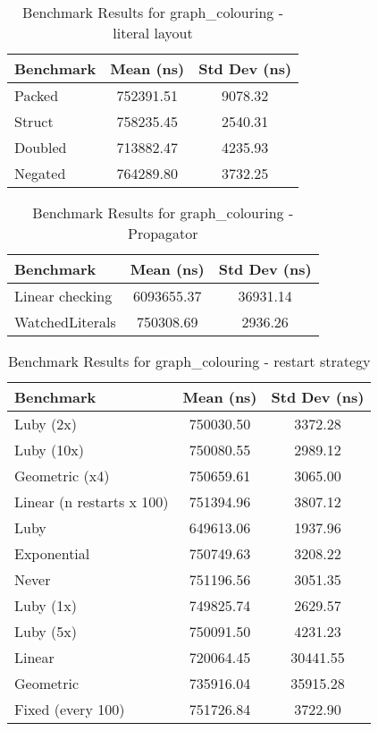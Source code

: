 \begin{table}[h]
    \centering
    \caption{Benchmark Results for graph\_colouring - literal layout}
    \begin{tabular}{|l|c|c|}
        \hline
        Benchmark & Mean (ns) & Std Dev (ns) \\
        \hline
        Packed & 752391.51 & 9078.32 \\
        Struct & 758235.45 & 2540.31 \\
        Doubled & 713882.47 & 4235.93 \\
        Negated & 764289.80 & 3732.25 \\
        \hline
    \end{tabular}
\label{tab:bench-graph_colouring---literal-layout}
\end{table}


\begin{table}[h]
    \centering
    \caption{Benchmark Results for graph\_colouring - Propagator}
    \begin{tabular}{|l|c|c|}
        \hline
        Benchmark & Mean (ns) & Std Dev (ns) \\
        \hline
        Linear checking & 6093655.37 & 36931.14 \\
        WatchedLiterals & 750308.69 & 2936.26 \\
        \hline
    \end{tabular}
\label{tab:bench-graph_colouring---Propagator}
\end{table}


\begin{table}[h]
    \centering
    \caption{Benchmark Results for graph\_colouring - restart strategy}
    \begin{tabular}{|l|c|c|}
        \hline
        Benchmark & Mean (ns) & Std Dev (ns) \\
        \hline
        Luby (2x) & 750030.50 & 3372.28 \\
        Luby (10x) & 750080.55 & 2989.12 \\
        Geometric (x4) & 750659.61 & 3065.00 \\
        Linear (n restarts x 100) & 751394.96 & 3807.12 \\
        Luby & 649613.06 & 1937.96 \\
        Exponential & 750749.63 & 3208.22 \\
        Never & 751196.56 & 3051.35 \\
        Luby (1x) & 749825.74 & 2629.57 \\
        Luby (5x) & 750091.50 & 4231.23 \\
        Linear & 720064.45 & 30441.55 \\
        Geometric & 735916.04 & 35915.28 \\
        Fixed (every 100) & 751726.84 & 3722.90 \\
        \hline
    \end{tabular}
\label{tab:bench-graph_colouring---restart-strategy}
\end{table}

